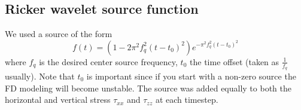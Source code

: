 \documentclass[10pt]{SelfArx} %
\theoremstyle{definition}
\begin{document}
\subsection{Ricker wavelet source function}
We used a source of the form
\begin{equation}
f\left(t\right) = \left(1 - 2\pi^2 f_q^2 (t-t_0)^2\right) e^{-\pi^2f_q^2 (t-t_0)^2}
\end{equation}
where $f_q$ is the desired center source frequency, $t_0$ the time offset (taken as $\frac{1}{f_q}$ usually). Note that $t_0$ is important since if you start with a non-zero source the FD modeling will become unstable. The source was added equally to both the horizontal and vertical stress $\tau_{xx}$ and $\tau_{zz}$ at each timestep.
\end{document}
